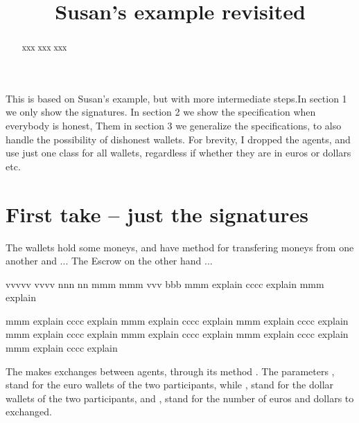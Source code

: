 \documentclass[acmsmall,review,anonymous,screen]{acmart}\settopmatter{printfolios=true,printacmref=false}
\begin{document}
\title{Susan's example revisited}
 



\begin{abstract}
xxx
xxx
xxx
\end{abstract}



\maketitle

\TabPositions{0.75cm, 1.25cm, 1.75cm, 2.25cm, 5cm}

This is based on Susan's example, but with more intermediate steps.In section 1 we only show the signatures. In section 2 we show the specification when everybody is honest, Them in  section 3 we generalize the specifications, to also handle the possibility of dishonest wallets.
For   brevity, I  dropped the agents, and use just one class for all wallets, regardless if whether they are in euros or dollars etc.

\section{First take --  just the signatures}
 
The wallets hold some moneys, and have method for transfering moneys from one another and ... The Escrow on the other hand ...
 
 vvvvv vvvv
nnn nn
mmm mmm vvv bbb
mmm explain cccc explain  mmm explain

mmm explain cccc explain  mmm explain cccc explain mmm explain cccc explain mmm explain cccc explain mmm explain cccc explain mmm explain cccc explain mmm explain cccc explain 

The  makes exchanges between agents, through its method .
 The parameters ,  stand for the euro wallets of the two participants, 
while  ,  stand for the dollar wallets of the two participants, 
and ,  stand for the number of euros and dollars to exchanged.
\end{document}
